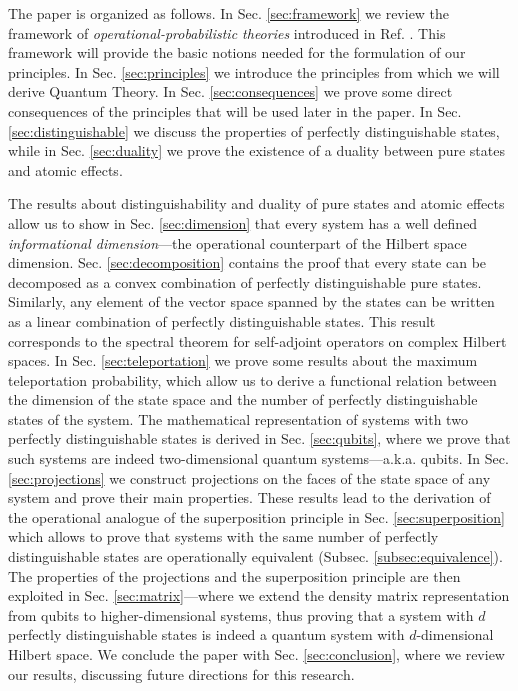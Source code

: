 \documentclass[12pt,aps,pra,showpacs,groupedaddress]{revtex4-1}
\begin{document}
The paper is organized as follows. In Sec. \ref{sec:framework} we
review the framework of {\em operational-probabilistic theories} 
introduced in Ref. \cite{purification}. This framework will provide the basic
notions needed for the formulation of our principles. In Sec.
\ref{sec:principles} we introduce the principles from which we will
derive Quantum Theory. In Sec.  \ref{sec:consequences} we prove some direct consequences of the principles that will be used later in the paper. In Sec. \ref{sec:distinguishable} we
discuss the properties of perfectly distinguishable states,  while in Sec. \ref{sec:duality} we prove the
existence of a duality between pure states and
atomic effects.  


The results about distinguishability and duality of pure states and atomic effects allow us to show
in Sec. \ref{sec:dimension} that every system has a well defined \emph{informational
  dimension}---the operational counterpart of the Hilbert space dimension. Sec.
\ref{sec:decomposition} contains the proof that every state can be decomposed as a convex
combination of perfectly distinguishable pure states. Similarly, any element of the vector space
spanned by the states can be written as a linear combination of perfectly distinguishable states.
This result corresponds to the spectral theorem for self-adjoint operators on complex Hilbert
spaces. In Sec.  \ref{sec:teleportation} we prove some results about the maximum teleportation
probability, which allow us to derive a functional relation between the dimension of the state space
and the number of perfectly distinguishable states of the system. The mathematical representation of
systems with two perfectly distinguishable states is derived in Sec.  \ref{sec:qubits}, where we
prove that such systems are indeed two-dimensional quantum systems---a.k.a. qubits. In Sec.
\ref{sec:projections} we construct projections on the faces of the state space of any system and
prove their main properties. These results lead to the derivation of the operational analogue of the
superposition principle in Sec. \ref{sec:superposition} which allows to prove that systems with the
same number of perfectly distinguishable states are operationally equivalent (Subsec.
\ref{subsec:equivalence}).  The properties of the projections and the superposition principle are
then exploited in Sec.  \ref{sec:matrix}---where we extend the density matrix representation from
qubits to higher-dimensional systems, thus proving that a system with $d$ perfectly distinguishable
states is indeed a quantum system with $d$-dimensional Hilbert space. We conclude the paper with
Sec.  \ref{sec:conclusion}, where we review our results, %
discussing future directions for this research.
\end{document}
